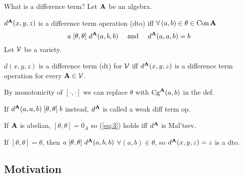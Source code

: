 \documentclass[notes=hide,12pt,xcolor=dvipsnames%
   ]{beamer}
\renewcommand{\defn}[1]{\alert{#1}}
\begin{document}
\begin{frame}[shrink=2,label=diff]{What is a difference term?}
  Let $\mathbf{A}$ be an algebra.

  $d^{\mathbf{A}}(x,y,z)$ is a \alert{difference term operation} (dto) iff 
  $\forall\, (a,b) \in \theta \in \operatorname{Con} \mathbf{A}$
  \begin{equation}
    \label{eq:3}  
    a \mathrel{[\theta, \theta]} d^{\mathbf{A}}(a,b,b) 
    \quad \text{ and } \quad
    d^{\mathbf{A}}(a,a,b) = b 
  \end{equation}
  \pause
  Let $\mathcal{V}$ be a variety. %

  $d(x,y,z)$ is a \alert{difference term} (dt) for $\mathcal{V}$ iff
  $d^{\mathbf{A}}(x,y,z)$ is a difference term operation for every $\mathbf{A} \in \mathcal{V}$.

  \pause
  By monotonicity of $[\cdot, \cdot]$ we can replace $\theta$ 
  with $\operatorname{Cg}^{\mathbf{A}}(a,b)$ in the def.

  \pause 
  If $d^{\mathbf{A}}(a,a,b) \mathrel{[\theta, \theta]} b$ instead, $d^{\mathbf{A}}$ is called a \alert{weak diff term op}.

  \pause
  If $\mathbf{A}$ is \alert{abelian},
  $[\theta, \theta] = 0_A$ so
  (\ref{eq:3}) holds iff $d^{\mathbf{A}}$ is Mal'tsev.

  \pause
  If $[\theta, \theta] = \theta$,  then
  $a \mathrel{[\theta, \theta]} d^{\mathbf{A}}(a,b,b)$ $\forall (a, b) \in \theta$, so
  $d^{\mathbf{A}}(x,y,z) = z$ is a dto.
\end{frame}



\subsection{Motivation}
\end{document}
